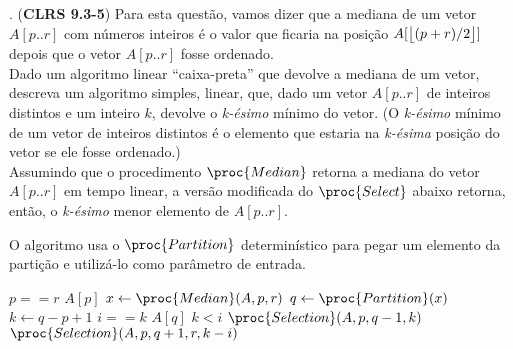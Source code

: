 . (\textbf{CLRS 9.3-5}) Para esta questão, vamos dizer que a mediana de um vetor $A[p..r]$ com números inteiros é o valor que ficaria na posição $A[\big\lfloor(p + r)/2\big\rfloor]$ depois que o vetor $A[p..r]$ fosse ordenado.\\
Dado um algoritmo linear “caixa-preta” que devolve a mediana de um vetor, descreva um algoritmo simples, linear, que, dado um vetor $A[p..r]$ de inteiros distintos e um inteiro $k$, devolve o \textit{k-ésimo} mínimo do vetor. (O \textit{k-ésimo} mínimo de um vetor de inteiros distintos é o elemento que estaria na \textit{k-ésima} posição do vetor se ele fosse ordenado.)\\[6pt]

Assumindo que o procedimento $\proc{Median}$ retorna a mediana do vetor $A[p..r]$ em tempo linear, a versão modificada do $\proc{Select}$ abaixo retorna, então, o \textit{k-ésimo} menor elemento de $A[p..r]$.

O algoritmo usa o $\proc{Partition}$ determinístico para pegar um elemento da partição e utilizá-lo como parâmetro de entrada.

\begin{codebox}
\li     \If $p == r$
        \Then
\li         \Return $A[p]$
\li     \End
\li     $x \gets \proc{Median}(A, p, r)$
\li     $q \gets \proc{Partition}(x)$
\li     $k \gets q - p + 1$
\li     \If $i == k$
        \Then
\li         \Return $A[q]$
\li     \ElseIf $k < i$
        \Then
\li        \Return $\proc{Selection}(A, p, q - 1, k)$
\li     \Else
\li         \Return $\proc{Selection}(A, p, q + 1, r, k - i)$
\li     \End
\end{codebox}